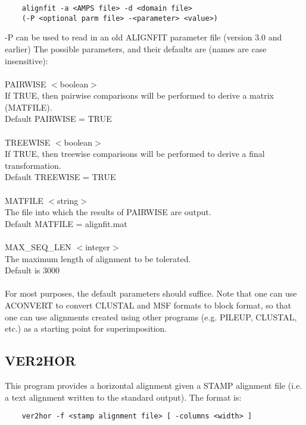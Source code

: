     \begin{scriptsize}\begin{verbatim}
    alignfit -a <AMPS file> -d <domain file> 
    (-P <optional parm file> -<parameter> <value>)
    \end{verbatim} \end{scriptsize}

    -P can be used to read in an old ALIGNFIT parameter file (version 3.0 and earlier)
    The possible parameters, and their defaults are (names are case 
    insensitive):\\
    \\
    PAIRWISE $<$boolean$>$\\
    If TRUE, then pairwise comparisons will be performed to derive a
    matrix (MATFILE).\\
    Default PAIRWISE = TRUE\\
    \\
    TREEWISE $<$boolean$>$\\
    If TRUE, then treewise comparisons will be performed to derive a
    final transformation.\\
    Default TREEWISE = TRUE\\
    \\
    MATFILE $<$string$>$\\
    The file into which the results of PAIRWISE are output.\\
    Default MATFILE = alignfit.mat\\
    \\
    MAX\_SEQ\_LEN $<$integer$>$\\
    The maximum length of alignment to be tolerated.\\
    Default is 3000\\
    \\
    For most purposes, the default parameters should suffice.  Note that one can
    use ACONVERT to convert CLUSTAL and MSF formats to block format, so that one can use alignments created
    using other programs (e.g. PILEUP, CLUSTAL, etc.) as a starting point for superimposition.

    \subsection{VER2HOR}

    This program provides a horizontal alignment given a STAMP alignment file
    (i.e. a text alignment written to the standard output).  The format is:

    \begin{scriptsize}\begin{verbatim}
    ver2hor -f <stamp alignment file> [ -columns <width> ]
    \end{verbatim} \end{scriptsize}

